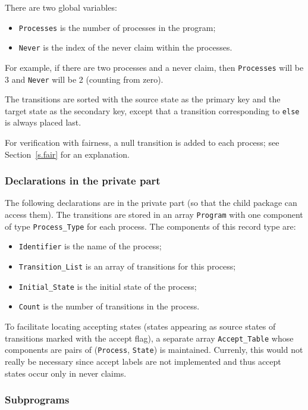 \documentclass[11pt]{article}
\newcommand*{\p}[1]{\texttt{#1}}
\begin{document}
There are two global variables:
\begin{itemize}
\item \p{Processes} is the number of processes in the program;
\item \p{Never} is the index of the never claim within the processes.
\end{itemize}
For example, if there are two processes and a never claim, then
\p{Processes} will be 3 and \p{Never} will be 2 (counting from zero).

The transitions are sorted with the source state as the primary key and
the target state as the secondary key, except that a transition
corresponding to \p{else} is always placed last.

For verification with fairness, a null transition is added to each
process; see Section~\ref{s.fair} for an explanation.

\subsubsection*{Declarations in the private part}

The following declarations are in the private part (so that the child
package can access them). The transitions are stored in an array
\p{Program} with one component of type \p{Process\_Type} for each
process. The components of this record type are:
\begin{itemize}
\item \p{Identifier} is the name of the process;
\item \p{Transition\_List} is an array of transitions for this process;
\item \p{Initial\_State} is the initial state of the process;
\item \p{Count} is the number of transitions in the process.
\end{itemize}

To facilitate locating accepting states (states appearing as source
states of transitions marked with the accept flag), a separate array
\p{Accept\_Table} whose components are pairs of (\p{Process}, \p{State})
is maintained. Currenly, this would not really be necessary since accept
labels are not implemented and thus accept states occur only in never
claims.

\subsubsection*{Subprograms}
\end{document}

